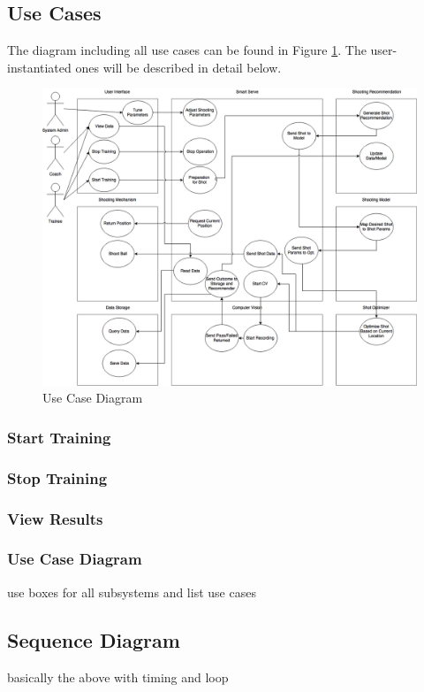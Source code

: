 \documentclass[11pt]{article}
\begin{document}
\subsection{Use Cases}
The diagram including all use cases can be found in Figure \ref{fig:usecase}. The user-instantiated ones will be described in detail below.
\begin{figure}[htbp]
   \centering
   \includegraphics[width=\textwidth]{img/UseCase.png} %
   \caption{Use Case Diagram}
   \label{fig:usecase}
\end{figure}
\subsubsection*{Start Training}
\subsubsection*{Stop Training}
\subsubsection*{View Results}
\subsubsection{Use Case Diagram}
use boxes for all subsystems and list use cases
\subsection{Sequence Diagram}
basically the above with timing and loop
\end{document}

